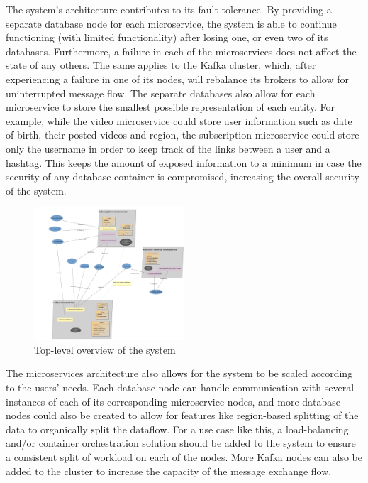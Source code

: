 \documentclass[parskip=full]{article}
\begin{document}
    The system's architecture contributes to its fault tolerance.
    By providing a separate database node for each microservice, the system is able to continue functioning (with limited functionality) after losing one, or even two of its databases.
    Furthermore, a failure in each of the microservices does not affect the state of any others.
    The same applies to the Kafka cluster, which, after experiencing a failure in one of its nodes, will rebalance its brokers to allow for uninterrupted message flow.
    The separate databases also allow for each microservice to store the smallest possible representation of each entity.
    For example, while the video microservice could store user information such as date of birth, their posted videos and region, the subscription microservice could store only the username in order to keep track of the links between a user and a hashtag.
    This keeps the amount of exposed information to a minimum in case the security of any database container is compromised, increasing the overall security of the system.

    \begin{figure}
        \includegraphics[width=0.5\textwidth]{video-platform-top-level-sirius}
        \caption{Top-level overview of the system}
        \label{fig:siriusSystemOverview}
        \vspace{-5em}
    \end{figure}

    The microservices architecture also allows for the system to be scaled according to the users' needs.
    Each database node can handle communication with several instances of each of its corresponding microservice nodes, and more database nodes could also be created to allow for features like region-based splitting of the data to organically split the dataflow.
    For a use case like this, a load-balancing and/or container orchestration solution should be added to the system to ensure a consistent split of workload on each of the nodes.
    More Kafka nodes can also be added to the cluster to increase the capacity of the message exchange flow.
\end{document}
